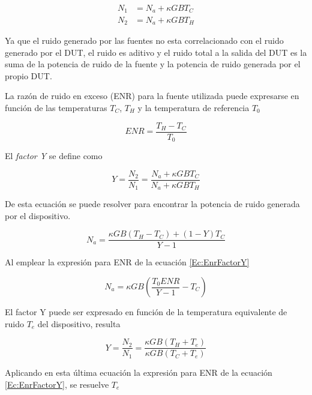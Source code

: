\documentclass{article}
\begin{document}
	\begin{equation}
		\begin{align}
			N_1 &= N_a+{\kappa}GBT_C \\
			N_2 &= N_a+{\kappa}GBT_H 
		\end{align}		
	\end{equation}
	
	Ya que el ruido generado por las fuentes no esta correlacionado con el ruido generado por el DUT, el ruido es aditivo y el ruido total a la salida del DUT es la suma de la potencia de ruido de la fuente y la potencia de ruido generada por el propio DUT.
		
	La razón de ruido en exceso (ENR) para la fuente utilizada puede expresarse en función de las temperaturas $T_C$, $T_H$ y la temperatura de referencia $T_0$
	
	\begin{equation}
		ENR = \frac{T_H - T_C}{T_0}
		\label{Ec:EnrFactorY}
	\end{equation}
	
	El \emph{factor Y} se define como	
	
	\begin{equation} 
		Y = \frac{N_2}{N_1} = \frac{N_a+{\kappa}GBT_C}{N_a+{\kappa}GBT_H}
	\end{equation}
	
	De esta ecuación se puede resolver para encontrar la potencia de ruido generada por el dispositivo.
	
	\begin{equation}
		N_a = \frac{{\kappa}GB(T_H - T_C) + (1 - Y)T_C}{Y - 1}
	\end{equation}
	
	Al emplear la expresión para ENR de la ecuación \eqref{Ec:EnrFactorY}
	
	\begin{equation} 
		N_a = {\kappa}GB\left(\frac{T_0ENR}{Y-1}-T_C\right)
	\end{equation}
	
	El factor Y puede ser expresado en función de la temperatura equivalente de ruido $T_e$ del dispositivo, resulta
	
	\begin{equation} 
		Y = \frac{N_2}{N_1} = \frac{{\kappa}GB(T_H + T_e)}{{\kappa}GB(T_C + T_e)}		
	\end{equation}	
	
	Aplicando en esta última ecuación la expresión para ENR de la ecuación \eqref{Ec:EnrFactorY}, se resuelve $T_e$
	
\end{document}
